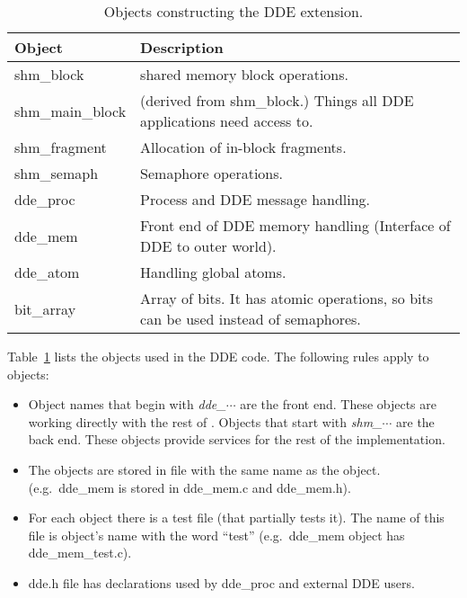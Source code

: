 \begin{table}[h]
    \begin{center}
        \leavevmode
        \begin{tabular}{|l|p{20em}|} \hline
            Object           & Description \\ \hline
            shm\_block       & shared memory block operations. \\
            shm\_main\_block & (derived from shm\_block.) Things all
                               DDE applications need access to. \\
            shm\_fragment    & Allocation of in-block fragments. \\
            shm\_semaph      & Semaphore operations. \\
            dde\_proc        & Process and DDE message handling. \\
            dde\_mem         & Front end of DDE memory handling
                               (Interface of DDE to outer world). \\
            dde\_atom        & Handling global atoms. \\ 
            bit\_array       & Array of bits. It has atomic
                               operations, so bits can be used instead
                               of semaphores. \\ \hline
        \end{tabular}
        \caption{Objects constructing the DDE extension.}
        \label{tab:ObjList}
    \end{center}
\end{table}

Table~\ref{tab:ObjList}{} lists the objects used in the DDE code.
The following rules apply to objects:

\begin{itemize} 
  \item Object names that begin with {\em dde\_$\cdots$}{} are the front
    end. These objects are working directly with the rest of
    \Wine. Objects that start with {\em shm\_$\cdots$}{} are the back
    end. These objects provide services for the rest of the
    implementation. 
  \item The objects are stored in file with the same name as the object.
    (e.g.\ dde\_mem is stored in dde\_mem.c and dde\_mem.h).
  \item For each object there is a test file (that partially tests it).
    The name of this file is object's name with the word ``test''
    (e.g.\ dde\_mem object has dde\_mem\_test.c).
  \item dde.h file has declarations used by dde\_proc and external DDE
    users.
\end{itemize}
    

